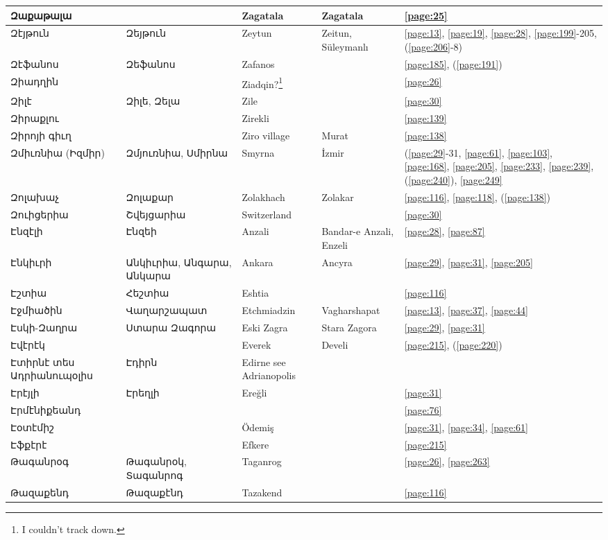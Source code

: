 \begin{center}
\begin{longtable}{|p{}|p{3cm}|p{3cm}|p{2cm}|p{3cm}|}
Զաքաթալա& & Zagatala &Zagatala &\ref{page:25}\\ \hline
Զէյթուն&Զեյթուն &Zeytun &Zeitun, Süleymanlı &\ref{page:13}, \ref{page:19}, \ref{page:28}, \ref{page:199}-205, (\ref{page:206}-8)\\ \hline
Զէֆանոս& Զեֆանոս&Zafanos & &\ref{page:185}, (\ref{page:191})\\ \hline
Զիադղին& &Ziadqin?\footnote{I couldn't track down.} & &\ref{page:26}\\ \hline
Զիլէ& Զիլե,   Զելա & Zile& &\ref{page:30}\\ \hline
Զիրաքլու& &Zirekli & &\ref{page:139}\\ \hline
Զիրոյի գիւղ& &Ziro village &Murat &\ref{page:138}\\ \hline
Զմիւռնիա (Իզմիր)&Զմյուռնիա, Սմիրնա  &Smyrna    &İzmir &(\ref{page:29}-31, \ref{page:61}, \ref{page:103}, \ref{page:168}, \ref{page:205}, \ref{page:233}, \ref{page:239}, (\ref{page:240}), \ref{page:249}\\ \hline
Զոլախաչ& Զոլաքար&Zolakhach & Zolakar&\ref{page:116}, \ref{page:118}, (\ref{page:138})\\ \hline
Զուիցերիա& Շվեյցարիա&Switzerland & &\ref{page:30}\\ \hline
Էնզէլի&Էնզեի & Anzali& Bandar-e Anzali, Enzeli&\ref{page:28}, \ref{page:87}\\ \hline
Էնկիւրի&Անկիւրիա, Անգարա, Անկարա &   Ankara&Ancyra &\ref{page:29}, \ref{page:31}, \ref{page:205}\\ \hline
Էշտիա&   Հեշտիա & Eshtia& &\ref{page:116}\\ \hline
Էջմիածին&Վաղարշապատ &Etchmiadzin & Vagharshapat&\ref{page:13}, \ref{page:37}, \ref{page:44}\\ \hline
Էսկի-Զաղրա& Ստարա Զագորա& Eski Zagra&Stara Zagora &\ref{page:29}, \ref{page:31}\\ \hline
Էվէրէկ& &Everek &Develi &\ref{page:215}, (\ref{page:220})\\ \hline
Էտիրնէ տես Ադրիանուպօլիս&Էդիրն &Edirne see Adrianopolis & &\\ \hline
Էրէյլի&Էրեղլի & Ereğli& &\ref{page:31}\\ \hline
Էրմէնիքեանդ& & & &\ref{page:76}\\ \hline
Էօտէմիշ& & Ödemiş& &\ref{page:31}, \ref{page:34}, \ref{page:61}\\ \hline
Էֆքէրէ& &Efkere & &\ref{page:215}\\ \hline
Թագանրօգ&Թագանրօկ, Տագանրոգ &Taganrog  & &\ref{page:26}, \ref{page:263}\\ \hline
Թազաքենդ&Թազաքէնդ & Tazakend& &\ref{page:116}\\ \hline

\end{longtable}
\end{center}
